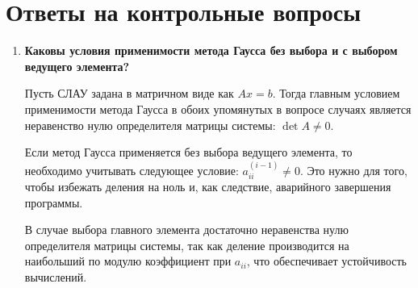 \documentclass[12pt, a4paper]{article}
\begin{document}
	\section*{Ответы на контрольные вопросы}
	\begin{enumerate}
		\item \textbf{Каковы условия применимости метода Гаусса без выбора и с выбором ведущего элемента?}
		
		Пусть СЛАУ задана в матричном виде как $Ax=b$. Тогда главным условием применимости метода Гаусса в обоих упомянутых в вопросе случаях является неравенство нулю определителя матрицы системы: $\det A\neq0$.
		
		Если метод Гаусса применяется без выбора ведущего элемента, то необходимо учитывать следующее условие: $a_{ii}^{(i-1)}\neq0$. Это нужно для того, чтобы избежать деления на ноль и, как следствие, аварийного завершения программы.
		
		В случае выбора главного элемента достаточно неравенства нулю определителя матрицы системы, так как деление производится на наибольший по модулю коэффициент при $a_{ii}$, что обеспечивает устойчивость вычислений.
	\end{enumerate}
	
\end{document}
